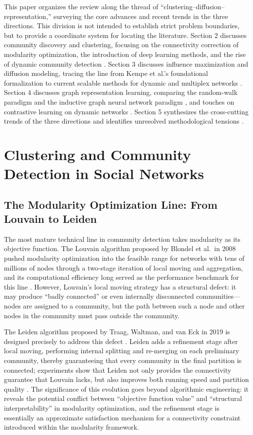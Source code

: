 \documentclass[12pt,a4paper]{article}
\begin{document}
This paper organizes the review along the thread of ``clustering--diffusion--representation,'' surveying the core advances and recent trends in the three directions. This division is not intended to establish strict problem boundaries, but to provide a coordinate system for locating the literature. Section 2 discusses community discovery and clustering, focusing on the connectivity correction of modularity optimization, the introduction of deep learning methods, and the rise of dynamic community detection \cite{ref1,ref2,ref3,ref5}. Section 3 discusses influence maximization and diffusion modeling, tracing the line from Kempe et al.'s foundational formalization to current scalable methods for dynamic and multiplex networks \cite{ref6,ref7,ref8}. Section 4 discusses graph representation learning, comparing the random-walk paradigm and the inductive graph neural network paradigm \cite{ref10,ref11}, and touches on contrastive learning on dynamic networks \cite{ref12}. Section 5 synthesizes the cross-cutting trends of the three directions and identifies unresolved methodological tensions \cite{ref13}.

\section{Clustering and Community Detection in Social Networks}

\subsection{The Modularity Optimization Line: From Louvain to Leiden}

The most mature technical line in community detection takes modularity as its objective function. The Louvain algorithm proposed by Blondel et al.\ in 2008 pushed modularity optimization into the feasible range for networks with tens of millions of nodes through a two-stage iteration of local moving and aggregation, and its computational efficiency long served as the performance benchmark for this line \cite{ref1}. However, Louvain's local moving strategy has a structural defect: it may produce ``badly connected'' or even internally disconnected communities---nodes are assigned to a community, but the path between such a node and other nodes in the community must pass outside the community.

The Leiden algorithm proposed by Traag, Waltman, and van Eck in 2019 is designed precisely to address this defect \cite{ref2}. Leiden adds a refinement stage after local moving, performing internal splitting and re-merging on each preliminary community, thereby guaranteeing that every community in the final partition is connected; experiments show that Leiden not only provides the connectivity guarantee that Louvain lacks, but also improves both running speed and partition quality \cite{ref2}. The significance of this evolution goes beyond algorithmic engineering: it reveals the potential conflict between ``objective function value'' and ``structural interpretability'' in modularity optimization, and the refinement stage is essentially an approximate satisfaction mechanism for a connectivity constraint introduced within the modularity framework.
\end{document}

